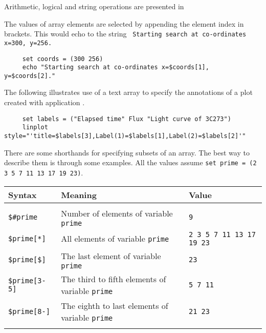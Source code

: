 Arithmetic, logical and string operations are presented in

The values of array elements are selected by appending the element
index in brackets.  This would echo to  the string ~{\tt Starting search at
co-ordinates x=300, y=256.}

\small
\begin{verbatim}
     set coords = (300 256)
     echo "Starting search at co-ordinates x=$coords[1], y=$coords[2]."
\end{verbatim}
\normalsize

The following illustrates use of a text array to specify the
annotations of a plot created with application 
.
\small
\begin{verbatim}
     set labels = ("Elapsed time" Flux "Light curve of 3C273")
     linplot style="'title=$labels[3],Label(1)=$labels[1],Label(2)=$labels[2]'"
\end{verbatim}
\normalsize

\medskip
There are some shorthands for specifying subsets of an array.  The best
way to describe them is through some examples.  
All the values assume {\tt set prime = (2 3 5 7 11 13 17 19 23)}.

\begin{center}
\begin{tabular}{lp{80mm}l}
Syntax            & Meaning                    & Value \\ \hline
\\
{\tt \$\#prime}   & Number of elements of variable {\tt prime} & {\tt 9} \\
{\tt \$prime[*]}  & All elements of variable {\tt prime} & {\tt 2 3 5 7 11 13
                                                           17 19 23} \\
{\tt \$prime[\$]} & The last element of variable {\tt prime} & {\tt 23} \\
{\tt \$prime[3-5]} & The third to fifth elements of variable {\tt prime} &
                                                           {\tt 5 7 11} \\
{\tt \$prime[8-]} & The eighth to last elements of variable {\tt prime} &
                                                           {\tt 21 23} \\
\\ \hline
\end{tabular}
\end{center}
\bigskip

